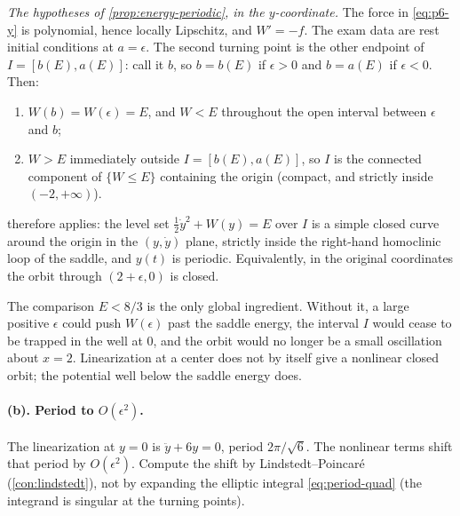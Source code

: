 \documentclass[11pt,a4paper]{article}
\begin{document}
\emph{The hypotheses of \cref{prop:energy-periodic}, in the \(y\)-coordinate.} The force in \eqref{eq:p6-y} is polynomial, hence locally Lipschitz, and \(W'=-f\). The exam data are rest initial conditions at \(a=\epsilon\). The second turning point is the other endpoint of \(I=[b(E),a(E)]\): call it \(b\), so \(b=b(E)\) if \(\epsilon>0\) and \(b=a(E)\) if \(\epsilon<0\). Then:
\begin{enumerate}[label=\textup{(\roman*)}]
    \item \(W(b)=W(\epsilon)=E\), and \(W<E\) throughout the open interval between \(\epsilon\) and \(b\);
    \item \(W>E\) immediately outside \(I=[b(E),a(E)]\), so \(I\) is the connected component of \(\{W\le E\}\) containing the origin (compact, and strictly inside \((-2,+\infty)\)).
\end{enumerate}
 therefore applies: the level set \(\frac12\dot y^{2}+W(y)=E\) over \(I\) is a simple closed curve around the origin in the \((y,\dot y)\) plane, strictly inside the right-hand homoclinic loop of the saddle, and \(y(t)\) is periodic. Equivalently, in the original coordinates the orbit through \((2+\epsilon,0)\) is closed.

The comparison \(E<8/3\) is the only global ingredient. Without it, a large positive \(\epsilon\) could push \(W(\epsilon)\) past the saddle energy, the interval \(I\) would cease to be trapped in the well at \(0\), and the orbit would no longer be a small oscillation about \(x=2\). Linearization at a center does not by itself give a nonlinear closed orbit; the potential well below the saddle energy does.

\paragraph{(b). Period to \(O(\epsilon^{2})\).}

The linearization at \(y=0\) is \(\ddot y+6y=0\), period \(2\pi/\sqrt{6}\). The nonlinear terms shift that period by \(O(\epsilon^{2})\). Compute the shift by Lindstedt--Poincar\'e (\cref{con:lindstedt}), not by expanding the elliptic integral \eqref{eq:period-quad} (the integrand is singular at the turning points).
\end{document}
